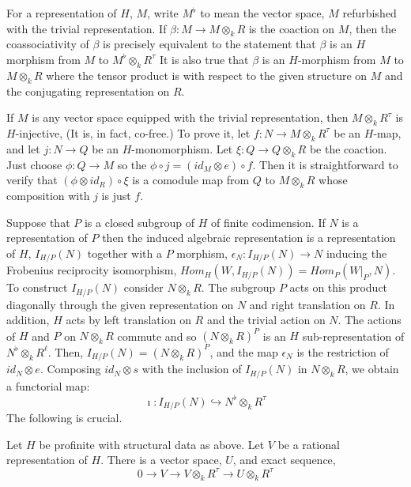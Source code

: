 For a representation of $H$, $M$, write $M^{\flat}$ to mean the vector space, $M$ refurbished with the trivial representation. If $\beta : M \rightarrow M \otimes_{k}R$ is the coaction on $M$, then the coassociativity of $\beta$ is precisely equivalent to the statement that $\beta$ is an $H$ morphism from $M$ to $M^{\flat} \otimes_{k}R^{\tau}$ It is also true that $\beta $ is an $H$-morphism from $M$ to $M \otimes_{k} R$ where the tensor product is with respect to the given structure on $M$ and the conjugating representation on $R$.

If $M$ is any vector space equipped with the trivial representation, then $M\otimes_{k} R^{\tau}$ is $H$-injective, (It is, in fact, co-free.) To prove it, let $f: N \rightarrow M\otimes_{k}R^{\tau}$ be an $H$-map, and let $j : N \rightarrow Q$ be an $H$-monomorphism. Let $\xi : Q \rightarrow Q \otimes_{k} R$ be the coaction. Just choose $\phi : Q \rightarrow M$ so the $\phi \circ j = (id_{M}\otimes e) \circ f$. Then it is straightforward to verify that $(\phi \otimes id_{R}) \circ \xi $ is a comodule map from $Q$ to $M \otimes_{k} R$ whose composition with $j$ is just $f$.

Suppose that $P$ is a closed subgroup of $H$ of finite codimension. If $N$ is a representation of $P$ then the induced algebraic representation is a representation of $H$, $I_{H/P}(N)$ together with a $P$ morphism,
$\epsilon_{N} : I_{H/P}(N)\rightarrow N$ inducing the Frobenius reciprocity isomorphism, $Hom_{H}(W, I_{H/P}(N))= Hom_{P}(W|_{P}, N)$. To construct $I_{H/P}(N)$ consider $N \otimes_{k} R$. The subgroup $P$ acts on this product diagonally through the given representation on $N$ and right translation on $R$. In addition, $H$ acts by left translation on $R$ and the trivial action on $N$. The actions of $H$ and $P$ on $N \otimes_{k} R$ commute and so $(N \otimes_{k} R)^{P}$ is an $H$ sub-representation of $N^{\flat} \otimes_{k} R^{\ell}$. Then, $I_{H/P}(N) = (N \otimes_{k} R)^{P}$, and the map $\epsilon_{N}$ is the restriction of $id_{N}\otimes e$. Composing $id_{N}\otimes s$ with the inclusion of $I_{H/P}(N)$ in $N\otimes_{k}R$, we obtain a functorial map: 
\begin{equation}\label{art6-eq-14.1}
\imath : I_{H/P}(N) \hookrightarrow N^{\flat} \otimes_{k} R^{\tau}
\end{equation}
The following is crucial.

\begin{lem}\label{art6-lemma-14.2}
Let $H$ be profinite with structural data as above. Let $V$ be a rational representation of $H$. There is a vector space, $U$, and exact sequence,
$$
0 \rightarrow V \rightarrow V\otimes_{k} R^{\tau} \rightarrow U \otimes_{k}R^{\tau}
$$
\end{lem}

